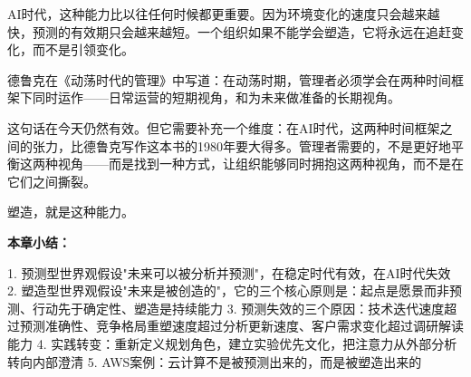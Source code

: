 AI时代，这种能力比以往任何时候都更重要。因为环境变化的速度只会越来越快，预测的有效期只会越来越短。一个组织如果不能学会塑造，它将永远在追赶变化，而不是引领变化。

德鲁克在《动荡时代的管理》中写道：在动荡时期，管理者必须学会在两种时间框架下同时运作——日常运营的短期视角，和为未来做准备的长期视角。

这句话在今天仍然有效。但它需要补充一个维度：在AI时代，这两种时间框架之间的张力，比德鲁克写作这本书的1980年要大得多。管理者需要的，不是更好地平衡这两种视角——而是找到一种方式，让组织能够同时拥抱这两种视角，而不是在它们之间撕裂。

塑造，就是这种能力。


\textbf{本章小结：}

1. 预测型世界观假设"未来可以被分析并预测"，在稳定时代有效，在AI时代失效
2. 塑造型世界观假设"未来是被创造的"，它的三个核心原则是：起点是愿景而非预测、行动先于确定性、塑造是持续能力
3. 预测失效的三个原因：技术迭代速度超过预测准确性、竞争格局重塑速度超过分析更新速度、客户需求变化超过调研解读能力
4. 实践转变：重新定义规划角色，建立实验优先文化，把注意力从外部分析转向内部澄清
5. AWS案例：云计算不是被预测出来的，而是被塑造出来的

